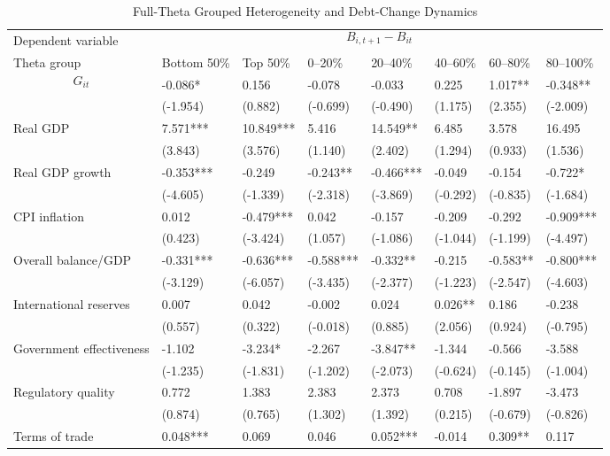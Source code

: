 \begin{table}[H]\centering
\begin{threeparttable}
\caption{Full-Theta Grouped Heterogeneity and Debt-Change Dynamics}
\label{tab:theta_group_heterogeneity_debt}
\scriptsize
\begin{tabularx}{\textwidth}{lYYYYYYY}
\toprule
Dependent variable &  \\
\cmidrule(lr){2-8}
Theta group & Bottom 50\% & Top 50\% & 0--20\% & 20--40\% & 40--60\% & 60--80\% & 80--100\% \\
\midrule
$$G_{it}$$ & -0.086* & 0.156 & -0.078 & -0.033 & 0.225 & 1.017** & -0.348** \\
  & (-1.954) & (0.882) & (-0.699) & (-0.490) & (1.175) & (2.355) & (-2.009) \\
Real GDP & 7.571*** & 10.849*** & 5.416 & 14.549** & 6.485 & 3.578 & 16.495 \\
  & (3.843) & (3.576) & (1.140) & (2.402) & (1.294) & (0.933) & (1.536) \\
Real GDP growth & -0.353*** & -0.249 & -0.243** & -0.466*** & -0.049 & -0.154 & -0.722* \\
  & (-4.605) & (-1.339) & (-2.318) & (-3.869) & (-0.292) & (-0.835) & (-1.684) \\
CPI inflation & 0.012 & -0.479*** & 0.042 & -0.157 & -0.209 & -0.292 & -0.909*** \\
  & (0.423) & (-3.424) & (1.057) & (-1.086) & (-1.044) & (-1.199) & (-4.497) \\
Overall balance/GDP & -0.331*** & -0.636*** & -0.588*** & -0.332** & -0.215 & -0.583** & -0.800*** \\
  & (-3.129) & (-6.057) & (-3.435) & (-2.377) & (-1.223) & (-2.547) & (-4.603) \\
International reserves & 0.007 & 0.042 & -0.002 & 0.024 & 0.026** & 0.186 & -0.238 \\
  & (0.557) & (0.322) & (-0.018) & (0.885) & (2.056) & (0.924) & (-0.795) \\
Government effectiveness & -1.102 & -3.234* & -2.267 & -3.847** & -1.344 & -0.566 & -3.588 \\
  & (-1.235) & (-1.831) & (-1.202) & (-2.073) & (-0.624) & (-0.145) & (-1.004) \\
Regulatory quality & 0.772 & 1.383 & 2.383 & 2.373 & 0.708 & -1.897 & -3.473 \\
  & (0.874) & (0.765) & (1.302) & (1.392) & (0.215) & (-0.679) & (-0.826) \\
Terms of trade & 0.048*** & 0.069 & 0.046 & 0.052*** & -0.014 & 0.309** & 0.117 \\

\end{tabularx}
\end{threeparttable}
\end{table}
